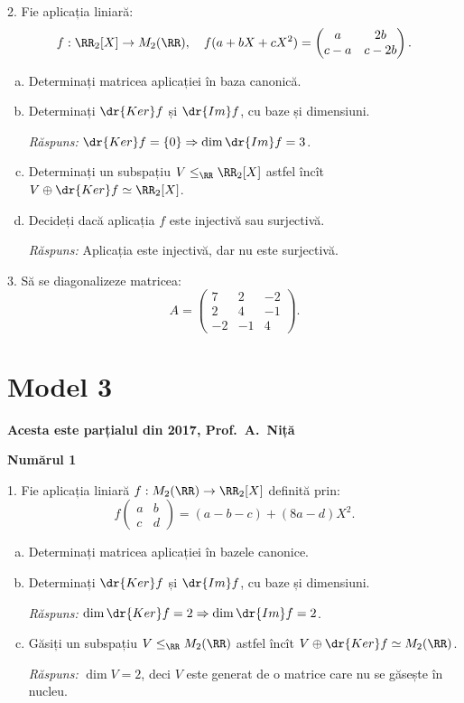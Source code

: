2. Fie aplicația liniară:
\[
  f : \RR_2[X] \to M_2(\RR), \quad %
  f(a + bX + cX^2) = \begin{pmatrix} a & 2b \\ c - a & c - 2b \end{pmatrix}.
\]
\begin{enumerate}[(a)]
\item Determinați matricea aplicației în baza canonică.
\item Determinați $ \dr{Ker} f $ și $ \dr{Im}f $, cu baze și dimensiuni.

  \emph{Răspuns:} $ \dr{Ker} f = \{ 0 \} \Rightarrow \dim \dr{Im} f = 3 $.
\item Determinați un subspațiu $ V \leq_\RR \RR_2[X] $ astfel încît
  $ V \oplus \dr{Ker} f \simeq \RR_2[X] $.
\item Decideți dacă aplicația $ f $ este injectivă sau surjectivă.

  \emph{Răspuns:} Aplicația este injectivă, dar nu este surjectivă.
\end{enumerate}

\vspace{1cm}

3. Să se diagonalizeze matricea:
\[
  A = \begin{pmatrix}
    7 & 2 & -2 \\
    2 & 4 & -1 \\
    -2 & -1 & 4
  \end{pmatrix}.    
\]

\vspace{1cm}


\section{Model 3}

\textbf{Acesta este parțialul din 2017, Prof.\ A.\ Niță}

\textbf{Numărul 1}

1. Fie aplicația liniară $ f : M_2(\RR) \to \RR_2[X] $ definită prin:
\[
  f \begin{pmatrix} a & b \\ c & d \end{pmatrix} = %
  (a - b - c) + (8a - d)X^2.
\]
\begin{enumerate}[(a)]
\item Determinați matricea aplicației în bazele canonice.
\item Determinați $ \dr{Ker} f $ și $ \dr{Im} f $, cu baze și dimensiuni.

  \emph{Răspuns:} $ \dim \dr{Ker} f = 2 \Rightarrow \dim \dr{Im} f = 2 $.
\item Găsiți un subspațiu $ V \leq_\RR M_2(\RR) $ astfel încît
  $ V \oplus \dr{Ker} f \simeq M_2(\RR) $.

  \emph{Răspuns:} $ \dim V = 2 $, deci $ V $ este generat de o matrice
  care nu se găsește în nucleu.
\end{enumerate}

